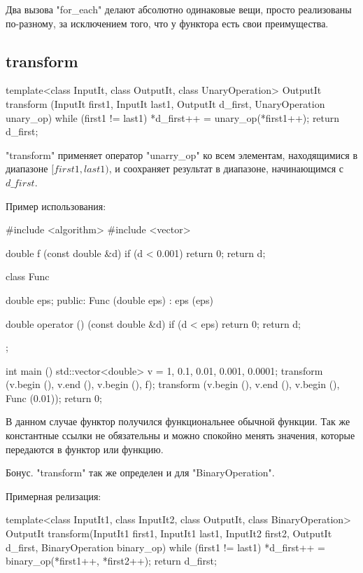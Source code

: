 Два вызова \cpp"for_each" делают абсолютно одинаковые вещи, просто реализованы по-разному, за исключением того, что у функтора есть свои преимущества.

\subsection{transform}
\begin{cppcode}
template<class InputIt, class OutputIt, class UnaryOperation>
OutputIt transform (InputIt first1, InputIt last1, OutputIt d_first, 
                    UnaryOperation unary_op) {
    while (first1 != last1) {
        *d_first++ = unary_op(*first1++);
    }
    return d_first;
}
\end{cppcode}

\cpp"transform" применяет оператор \cpp"unarry_op" ко всем элементам, находящимися в диапазоне $[first1, last1)$, и соохраняет результат в диапазоне, начинающимся с $d\_first$.

Пример использования:

\begin{cppcode}
#include <algorithm>
#include <vector>

double f (const double &d) {
    if (d < 0.001)
        return 0;
    return d;
}

class Func {
    double eps; 
public:
    Func (double eps) : eps (eps) {}

    double operator () (const double &d) {
        if (d < eps)
            return 0;
        return d;
    }
};

int main () {
    std::vector<double> v = {1, 0.1, 0.01, 0.001, 0.0001};
    transform (v.begin (), v.end (), v.begin (), f);
    transform (v.begin (), v.end (), v.begin (), Func (0.01));
    return 0;
}
\end{cppcode}

В данном случае функтор получился функциональнее обычной функции. 
Так же константные ссылки не обязательны и можно спокойно менять значения, которые передаются в функтор или функцию. 

Бонус. 
\cpp"transform" так же определен и для \cpp"BinaryOperation".

Примерная релизация:
\begin{cppcode}
template<class InputIt1, class InputIt2,
         class OutputIt, class BinaryOperation>
OutputIt transform(InputIt1 first1, InputIt1 last1, InputIt2 first2,
                   OutputIt d_first, BinaryOperation binary_op) {
    while (first1 != last1) {
        *d_first++ = binary_op(*first1++, *first2++);
    }
    return d_first;
}
\end{cppcode}

